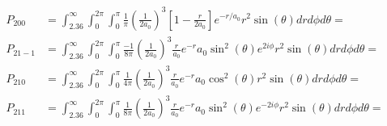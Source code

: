 \documentclass[10pt]{article} %
\begin{document}
\begin{align*}
  P_{200} &= \int_{2.36}^\infty \int_0^{2\pi} \int_0^\pi
  \frac{1}{\pi}\left(\frac{1}{2a_0}\right)^3\left[1-\frac{r}{2a_0}\right]e^{-r/a_0}
  r^2\sin(\theta)drd\phi d\theta = \\
  P_{21-1} &= \int_{2.36}^\infty \int_0^{2\pi} \int_0^\pi
  \frac{-1}{8\pi}\left(\frac{1}{2a_0}\right)^3\frac{r}{a_0}e^{-r}{a_0}\sin^2(\theta)e^{2i\phi}
  r^2\sin(\theta)drd\phi d\theta = \\
  P_{210} &= \int_{2.36}^\infty \int_0^{2\pi} \int_0^\pi
  \frac{1}{4\pi}\left(\frac{1}{2a_0}\right)^3\frac{r}{a_0}e^{-r}{a_0}\cos^2(\theta)
  r^2\sin(\theta)drd\phi d\theta = \\
  P_{211} &= \int_{2.36}^\infty \int_0^{2\pi} \int_0^\pi
  \frac{1}{8\pi}\left(\frac{1}{2a_0}\right)^3\frac{r}{a_0}e^{-r}{a_0}\sin^2(\theta)e^{-2i\phi}
  r^2\sin(\theta)drd\phi d\theta = \\
\end{align*}
\end{document}
